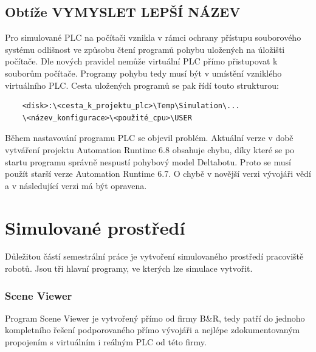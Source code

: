     \section{Obtíže VYMYSLET LEPŠÍ NÁZEV}
    Pro simulované PLC na počítači vznikla v rámci ochrany přístupu souborového systému
    odlišnost ve způsobu čtení programů pohybu uložených na úložišti počítače. Dle 
    nových pravidel nemůže virtuální PLC přímo přistupovat k souborům počítače. Programy
    pohybu tedy musí být v umístění vzniklého virtuálního PLC.
    Cesta uložených programů se pak řídí touto strukturou:
    \begin{lstlisting}
    <disk>:\<cesta_k_projektu_plc>\Temp\Simulation\...
    \<název_konfigurace>\<použité_cpu>\USER
    \end{lstlisting}

    Během nastavování programu PLC se objevil problém. Aktuální verze v době vytváření
    projektu Automation Runtime 6.8 obsahuje chybu, díky které se po startu programu
    správně nespustí pohybový model Deltabotu. Proto se musí použít starší verze 
    Automation Runtime 6.7. O chybě v novější verzi vývojáři vědí a v následující verzi 
    má být opravena.






\chapter{Simulované prostředí}
    Důležitou částí semestrální práce je vytvoření simulovaného
    prostředí pracoviště robotů. Jsou tři hlavní programy, ve kterých 
    lze simulace vytvořit. %

    \subsection*{Scene Viewer}
        Program Scene Viewer je vytvořený přímo od firmy B\&R, tedy 
        patří do jednoho kompletního řešení podporovaného přímo
        vývojáři a nejlépe zdokumentovaným propojením s virtuálním
        i reálným PLC od této firmy.
    
